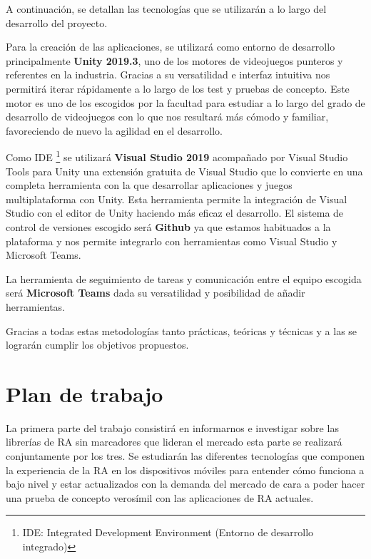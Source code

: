 A continuación, se detallan las tecnologías que se utilizarán a lo largo del desarrollo del proyecto.\vspace{\baselineskip}

Para la creación de las aplicaciones, se utilizará como entorno de desarrollo principalmente \textbf{Unity 2019.3}, uno de los motores de videojuegos punteros y referentes en la industria. Gracias a su versatilidad e interfaz intuitiva nos permitirá iterar rápidamente a lo largo de los test y pruebas de concepto. Este motor es uno de los escogidos por la facultad para estudiar a lo largo del grado de desarrollo de videojuegos con lo que nos resultará más cómodo y familiar, favoreciendo de nuevo la agilidad en el desarrollo.\vspace{\baselineskip}

Como IDE \footnote{IDE: Integrated Development Environment (Entorno de desarrollo integrado)}  se utilizará \textbf{Visual Studio 2019} acompañado por Visual Studio Tools para Unity una extensión gratuita de Visual Studio que lo convierte en una completa herramienta con la que desarrollar aplicaciones y juegos multiplataforma con Unity. Esta herramienta permite la integración de Visual Studio con el editor de Unity haciendo más eficaz el desarrollo.\vspace{\baselineskip}
El sistema de control de versiones escogido será \textbf{Github} ya que estamos habituados a la plataforma y nos permite integrarlo con herramientas como Visual Studio y Microsoft Teams.\vspace{\baselineskip}

La herramienta de seguimiento de tareas y comunicación entre el equipo escogida será \textbf{Microsoft Teams} dada su versatilidad y posibilidad de añadir herramientas.\vspace{\baselineskip}

Gracias a todas estas metodologías tanto prácticas, teóricas y técnicas y a las se lograrán cumplir los objetivos propuestos.\vspace{\baselineskip}

\section{Plan de trabajo}
La primera parte del trabajo consistirá en informarnos e investigar sobre las librerías de RA sin marcadores que lideran el mercado esta parte se realizará conjuntamente por los tres. Se estudiarán las diferentes tecnologías que componen la experiencia de la RA en los dispositivos móviles para entender cómo funciona a bajo nivel y estar actualizados con la demanda del mercado de cara a poder hacer una prueba de concepto verosímil con las aplicaciones de RA actuales. \vspace{\baselineskip}


